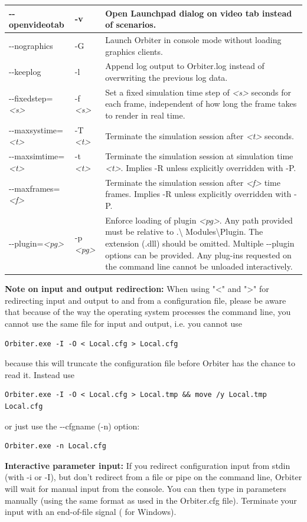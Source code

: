 \documentclass[Orbiter User Manual.tex]{subfiles}
\begin{document}
\begin{longtable}{ p{} p{}
		>{\RaggedRight}p{} }
	\hline
	-{}-openvideotab & -v & Open Launchpad dialog on video tab instead of
		scenarios.\\
	\hline
	-{}-nographics & -G & Launch Orbiter in console mode without loading
		graphics clients.\\
	\hline
	-{}-keeplog & -l & Append log output to Orbiter.log instead of overwriting
		the previous log data.\\
	\hline
	-{}-fixedstep=\textit{<s>} & -f \textit{<s>} & Set a fixed simulation time
		step of \textit{<s>} seconds for each frame, independent of how long the
		frame takes to render in real time.\\
	\hline
	-{}-maxsystime=\textit{<t>} & -T \textit{<t>} & Terminate the simulation
		session after \textit{<t>} seconds.\\
	\hline
	-{}-maxsimtime=\textit{<t>} & -t \textit{<t>} & Terminate the simulation
		session at simulation time \textit{<t>}. Implies -R unless explicitly
		overridden with -P.\\
	\hline
	-{}-maxframes=\textit{<f>} & & Terminate the simulation session after
		\textit{<f>} time frames. Implies -R unless explicitly overridden with
		-P.\\
	\hline
	-{}-plugin=\textit{<pg>} & -p \textit{<pg>} & Enforce loading of plugin
		\textit{<pg>}. Any path provided must be relative to .\textbackslash
		Modules\textbackslash Plugin. The extension (.dll) should be omitted.
		Multiple -{}-plugin options can be provided. Any plug-ins requested on
		the command line cannot be unloaded interactively.\\
	\hline
	\end{longtable}

\textbf{Note on input and output redirection:}
When using "<" and ">" for redirecting input and output to and from a configuration file, please be aware that because of the way the operating system
processes the command line, you cannot use the same file for input and output, i.e. you cannot use
\begin{lstlisting}[language=OSFS]
Orbiter.exe -I -O < Local.cfg > Local.cfg
\end{lstlisting}
because this will truncate the configuration file before Orbiter has the chance to read it. Instead use
\begin{lstlisting}[language=OSFS]
Orbiter.exe -I -O < Local.cfg > Local.tmp && move /y Local.tmp Local.cfg
\end{lstlisting}
or just use the -{}-cfgname (-n) option:
\begin{lstlisting}[language=OSFS]
Orbiter.exe -n Local.cfg
\end{lstlisting}

\textbf{Interactive parameter input:}
If you redirect configuration input from stdin (with -i or -I), but don't redirect from a file or pipe on the command line, Orbiter will wait for
manual input from the console. You can then type in parameters manually (using the same format as used in the Orbiter.cfg file). Terminate
your input with an end-of-file signal ( for Windows).
\end{document}
